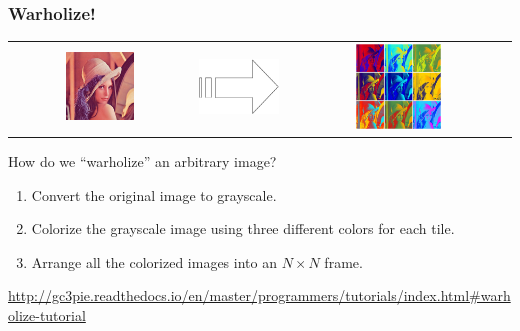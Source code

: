 \documentclass[english,serif,mathserif,xcolor=pdftex,dvipsnames,table]{beamer}
\begin{document}
\begin{frame}
  \frametitle{Warholize!}

  \begin{tabular}[c]{ccc}
    \includegraphics[width=0.4\textwidth]{fig/lena.jpg}
    &
    {\includegraphics[width=0.1\linewidth,totalheight=0.45\textheight]{fig/arrow.pdf}}
    &
    \includegraphics[width=0.4\textwidth]{fig/warholized-lena.jpg}
  \end{tabular}
\end{frame}


\begin{frame}[fragile]
  How do we ``warholize'' an arbitrary image?

  \+
  \begin{enumerate}
  \item Convert the original image to grayscale.
  \item Colorize the grayscale image using three different colors for each tile.
  \item Arrange all the colorized images into an $N\times N$ frame.
  \end{enumerate}

  \+
  \begin{references}
    \url{http://gc3pie.readthedocs.io/en/master/programmers/tutorials/index.html#warholize-tutorial}
  \end{references}
\end{frame}
\end{document}
